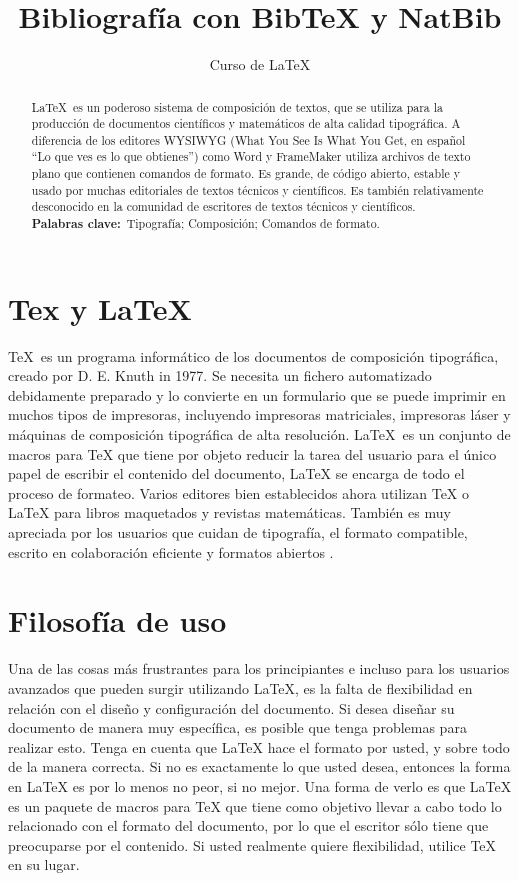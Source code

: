 \documentclass[12pt,letterpaper]{article}
\author{Curso de \LaTeX}
\title{Bibliografía con BibTeX y NatBib}
\begin{document}
\maketitle %

\begin{abstract}
	\LaTeX\ es un poderoso sistema de composición de textos, que se utiliza
	para la producción de documentos científicos y matemáticos
	de alta calidad tipográfica. A diferencia de los editores WYSIWYG (What You See Is What You Get, en español ``Lo que ves es lo que obtienes'') como Word y FrameMaker 
	utiliza archivos de texto plano que contienen 
	comandos de formato. Es grande, de código abierto, estable y usado
	por muchas editoriales de textos técnicos y científicos. Es
	también relativamente desconocido en la comunidad de escritores de textos técnicos y científicos.\\
	
	\noindent\textbf{Palabras clave:}\ Tipografía; Composición; Comandos de formato.
\end{abstract}

\section{Tex y LaTeX} %

\TeX\ es un programa informático de los documentos de composición tipográfica, creado por D. E. Knuth in 1977. Se necesita un fichero automatizado debidamente preparado y lo convierte en un formulario que se puede imprimir en muchos tipos de impresoras, incluyendo impresoras matriciales, impresoras láser y máquinas de composición tipográfica de alta resolución. \LaTeX\ es un conjunto de macros para TeX que tiene por objeto reducir la tarea del usuario para el único papel de escribir el contenido del documento, LaTeX se encarga de todo el proceso de formateo. Varios editores bien establecidos ahora utilizan TeX o LaTeX para libros maquetados y revistas matemáticas. También es muy apreciada por los usuarios que cuidan de tipografía, el formato compatible, escrito en colaboración eficiente y formatos abiertos \citep{Boney96}.

\section{Filosofía de uso} %

Una de las cosas más frustrantes para los principiantes e incluso para los usuarios avanzados que pueden surgir utilizando \LaTeX, es la falta de flexibilidad en relación con el diseño y configuración del documento. Si desea diseñar su documento de manera muy específica, es posible que tenga problemas para realizar esto. Tenga en cuenta que LaTeX hace el formato por usted, y sobre todo de la manera correcta. Si no es exactamente lo que usted desea, entonces la forma en LaTeX es por lo menos no peor, si no mejor. Una forma de verlo es que LaTeX es un paquete de macros para TeX que tiene como objetivo llevar a cabo todo lo relacionado con el formato del documento, por lo que el escritor sólo tiene que preocuparse por el contenido. Si usted realmente quiere flexibilidad, utilice TeX en su lugar.
\end{document}
